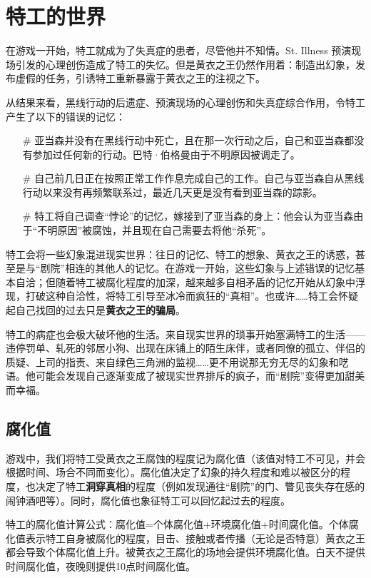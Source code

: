 \section{特工的世界}

在游戏一开始，特工就成为了失真症的患者，尽管他并不知情。St. Illness 预演现场引发的心理创伤造成了特工的失忆。但是黄衣之王仍然作用着：制造出幻象，发布虚假的任务，引诱特工重新暴露于黄衣之王的注视之下。

从结果来看，黑线行动的后遗症、预演现场的心理创伤和失真症综合作用，令特工产生了以下的错误的记忆：

\begin{itemize}
    \item[\#] 亚当森并没有在黑线行动中死亡，且在那一次行动之后，自己和亚当森都没有参加过任何新的行动。巴特·伯格曼由于不明原因被调走了。
    \item[\#] 自己前几日正在按照正常工作作息完成自己的工作。自己与亚当森自从黑线行动以来没有再频繁联系过，最近几天更是没有看到亚当森的踪影。
    \item[\#] 特工将自己调查“悖论”的记忆，嫁接到了亚当森的身上：他会认为亚当森由于“不明原因”被腐蚀，并且现在自己需要去将他“杀死”。
\end{itemize}

特工会将一些幻象混进现实世界：往日的记忆、特工的想象、黄衣之王的诱惑，甚至是与“剧院”相连的其他人的记忆。在游戏一开始，这些幻象与上述错误的记忆基本自洽；但随着特工被腐化程度的加深，越来越多自相矛盾的记忆开始从幻象中浮现，打破这种自洽性，将特工引导至冰冷而疯狂的“真相”。也或许……特工会怀疑起自己找回的过去只是\textbf{黄衣之王的骗局}。

特工的病症也会极大破坏他的生活。来自现实世界的琐事开始塞满特工的生活——违停罚单、轧死的邻居小狗、出现在床铺上的陌生床伴，或者同僚的孤立、伴侣的质疑、上司的指责、来自绿色三角洲的监视……更不用说那无穷无尽的幻象和呓语。他可能会发现自己逐渐变成了被现实世界排斥的疯子，而“剧院”变得更加甜美而幸福。

\subsection{腐化值}
游戏中，我们将特工受黄衣之王腐蚀的程度记为腐化值（该值对特工不可见，并会根据时间、场合不同而变化）。腐化值决定了幻象的持久程度和难以被区分的程度，也决定了特工\textbf{洞穿真相}的程度（例如发现通往“剧院”的门、瞥见丧失存在感的闹钟酒吧等）。同时，腐化值也象征特工可以回忆起过去的程度。

特工的腐化值计算公式：腐化值=个体腐化值+环境腐化值+时间腐化值。个体腐化值表示特工自身被腐化的程度，目击、接触或者传播（无论是否特意）黄衣之王都会导致个体腐化值上升。被黄衣之王腐化的场地会提供环境腐化值。白天不提供时间腐化值，夜晚则提供10点时间腐化值。

